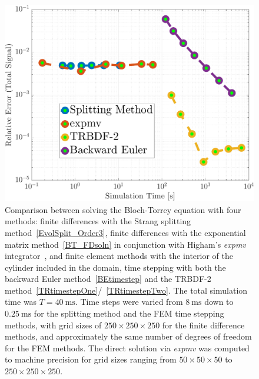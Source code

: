 \documentclass[twocolumn,twoside]{article}
\begin{document}
\clearpage
\begin{figure}[H]
\centering
\begin{minipage}{1.0\textwidth}
    \centering
    \includegraphics[keepaspectratio=true,width=1.0\textwidth]{figures/CompareFEM}
    \caption{Comparison between solving the Bloch-Torrey equation with four methods: finite differences with the Strang splitting method~\eqref{EvolSplit_Order3}, finite differences with the exponential matrix method~\eqref{BT_FDsoln} in conjunction with Higham's \textit{expmv} integrator~\cite{al-mohy_computing_2011}, and finite element methods with the interior of the cylinder included in the domain, time stepping with both the backward Euler method~\eqref{BEtimestep} and the \textsc{TRBDF-2} method~\eqref{TRtimestepOne}/~\eqref{TRtimestepTwo}.
    The total simulation time was $T=\SI{40}{\milli\second}$.
    Time steps were varied from $\SI{8}{\milli\second}$ down to $\SI{0.25}{\milli\second}$ for the splitting method and the FEM time stepping methods, with grid sizes of $250\!\times\!250\!\times\!250$ for the finite difference methods, and approximately the same number of degrees of freedom for the FEM methods.
    The direct solution via \textit{expmv} was computed to machine precision for grid sizes ranging from $50\!\times\!50\!\times\!50$ to $250\!\times\!250\!\times\!250$.}
    \label{fig:CompareFEM}
\end{minipage}
\end{figure}
\end{document}
